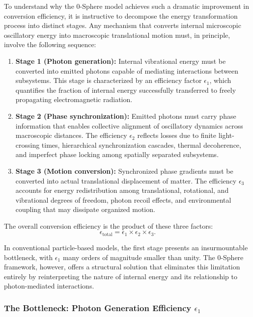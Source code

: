\documentclass[12pt,letterpaper]{article}
\begin{document}
To understand why the 0-Sphere model achieves such a dramatic improvement in conversion efficiency, it is instructive to decompose the energy transformation process into distinct stages. Any mechanism that converts internal microscopic oscillatory energy into macroscopic translational motion must, in principle, involve the following sequence:

\begin{enumerate}
\item \textbf{Stage 1 (Photon generation):} Internal vibrational energy must be converted into emitted photons capable of mediating interactions between subsystems. This stage is characterized by an efficiency factor $\epsilon_1$, which quantifies the fraction of internal energy successfully transferred to freely propagating electromagnetic radiation.

\item \textbf{Stage 2 (Phase synchronization):} Emitted photons must carry phase information that enables collective alignment of oscillatory dynamics across macroscopic distances. The efficiency $\epsilon_2$ reflects losses due to finite light-crossing times, hierarchical synchronization cascades, thermal decoherence, and imperfect phase locking among spatially separated subsystems.

\item \textbf{Stage 3 (Motion conversion):} Synchronized phase gradients must be converted into actual translational displacement of matter. The efficiency $\epsilon_3$ accounts for energy redistribution among translational, rotational, and vibrational degrees of freedom, photon recoil effects, and environmental coupling that may dissipate organized motion.
\end{enumerate}

The overall conversion efficiency is the product of these three factors:
\begin{equation}
\epsilon_{\text{total}} = \epsilon_1 \times \epsilon_2 \times \epsilon_3.
\end{equation}

In conventional particle-based models, the first stage presents an insurmountable bottleneck, with $\epsilon_1$ many orders of magnitude smaller than unity. The 0-Sphere framework, however, offers a structural solution that eliminates this limitation entirely by reinterpreting the nature of internal energy and its relationship to photon-mediated interactions.

\subsubsection{The Bottleneck: Photon Generation Efficiency $\epsilon_1$}
\label{subsubsec:epsilon1_bottleneck}
\end{document}
